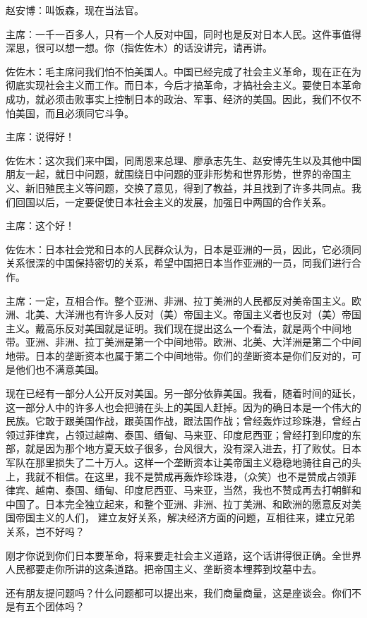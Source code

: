赵安博：叫饭森，现在当法官。

主席：一千一百多人，只有一个人反对中国，同时也是反对日本人民。这件事值得深思，很可以想一想。你（指佐佐木）的话没讲完，请再讲。

佐佐木：毛主席问我们怕不怕美国人。中国已经完成了社会主义革命，现在正在为彻底实现社会主义而工作。而日本，今后才搞革命，才搞社会主义。要使日本革命成功，就必须击败事实上控制日本的政治、军事、经济的美国。因此，我们不仅不怕美国，而且必须同它斗争。

主席：说得好！

佐佐木：这次我们来中国，同周恩来总理、廖承志先生、赵安博先生以及其他中国朋友一起，就日中问题，就围绕日中问题的亚非形势和世界形势，世界的帝国主义、新旧殖民主义等问题，交换了意见，得到了教益，并且找到了许多共同点。我们回国以后，一定要促使日本社会主义的发展，加强日中两国的合作关系。

主席：这个好！

佐佐木：日本社会党和日本的人民群众认为，日本是亚洲的一员，因此，它必须同关系很深的中国保持密切的关系，希望中国把日本当作亚洲的一员，同我们进行合作。

主席：一定，互相合作。整个亚洲、非洲、拉丁美洲的人民都反对美帝国主义。欧洲、北美、大洋洲也有许多人反对（美）帝国主义。帝国主义者也反对（美）帝国主义。戴高乐反对美国就是证明。我们现在提出这么一个看法，就是两个中间地带。亚洲、非洲、拉丁美洲是第一个中间地带。欧洲、北美、大洋洲是第二个中间地带。日本的垄断资本也属于第二个中间地带。你们的垄断资本是你们反对的，可是他们也不满意美国。

现在已经有一部分人公开反对美国。另一部分依靠美国。我看，随着时间的延长，这一部分人中的许多人也会把骑在头上的美国人赶掉。因为的确日本是一个伟大的民族。它敢于跟美国作战，跟英国作战，跟法国作战；曾经轰炸过珍珠港，曾经占领过菲律宾，占领过越南、泰国、缅甸、马来亚、印度尼西亚；曾经打到印度的东部，就是因为那个地方夏天蚊子很多，台风很大，没有深入进去，打了败仗。日本军队在那里损失了二十万人。这样一个垄断资本让美帝国主义稳稳地骑往自己的头上，我就不相信。在这里，我不是赞成再轰炸珍珠港，（众笑）也不是赞成占领菲律宾、越南、泰国、缅甸、印度尼西亚、马来亚，当然，我也不赞成再去打朝鲜和中国了。日本完全独立起来，和整个亚洲、非洲、拉丁美洲、和欧洲的愿意反对美国帝国主义的人们， 建立友好关系，解决经济方面的问题，互相往来，建立兄弟关系，岂不好吗？

刚才你说到你们日本要革命，将来要走社会主义道路，这个话讲得很正确。全世界人民都要走你所讲的这条道路。把帝国主义、垄断资本埋葬到坟墓中去。

还有朋友提问题吗？什么问题都可以提出来，我们商量商量，这是座谈会。你们不是有五个团体吗？

